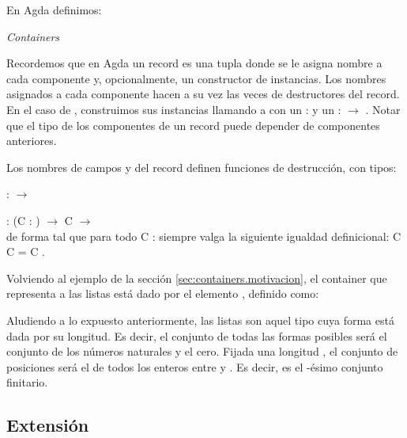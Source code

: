 En Agda definimos: 

\begin{agdacode}\label{code:cont}{\it Containers}

\end{agdacode}

Recordemos que en Agda un record es una tupla donde se le asigna nombre a cada componente y, opcionalmente, un constructor de instancias. Los nombres asignados a cada componente hacen a su vez las veces de destructores del record.
En el caso de , construimos sus instancias llamando a  \AgdaInductiveConstructor{$\_\tri\_$} con un  :  y un  :  $\to$ . Notar que el tipo de los componentes de un record puede depender de componentes anteriores.

Los nombres de campos \Sh y \Pos del record  definen funciones de destrucción, con tipos:

\sangrar
\Sh :  $\to$ 

\sangrar
\Pos : (C : ) $\to$ \Sh C $\to$ \\
de forma tal que para todo C :  siempre valga la siguiente igualdad definicional: \Sh C \AgdaInductiveConstructor{$\tri$} \Pos C = C .

\begin{example}
Volviendo al ejemplo de la sección \ref{sec:containers.motivacion},
el container que representa a las listas está dado por el elemento , definido como:


Aludiendo a lo expuesto anteriormente, las listas son aquel tipo cuya forma está dada por su longitud. Es decir, el conjunto de todas las formas posibles será el conjunto de los números naturales y el cero. Fijada una longitud , el conjunto de posiciones será el de todos los enteros entre  y . Es decir, es el -ésimo conjunto finitario.
\end{example}

 
\subsection{Extensión}
  
